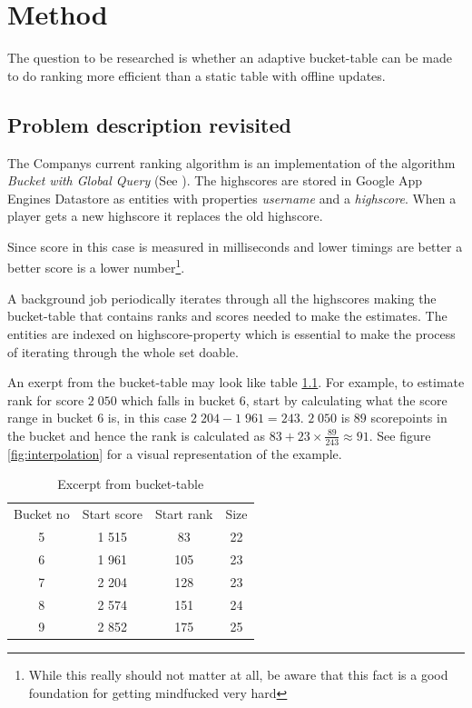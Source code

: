 \chapter{\label{method}Method}

The question to be researched is whether an adaptive bucket-table can be made to do ranking more efficient than a static table with offline updates.

\section{Problem description revisited}

The Companys current ranking algorithm is an implementation of the algorithm \emph{Bucket with Global Query} (See ). The highscores are stored in Google App Engines Datastore as entities with properties \emph{username} and a \emph{highscore}. When a player gets a new highscore it replaces the old highscore.

Since score in this case is measured in milliseconds and lower timings are better a better score is a lower number\footnote{While this really should not matter at all, be aware that this fact is a good foundation for getting mindfucked very hard}.

A background job  periodically iterates through all the highscores making the bucket-table that contains ranks and scores needed to make the estimates. The entities are indexed on highscore-property which is essential to make the process of iterating through the whole set doable.


An exerpt from the bucket-table may look like table \ref{table:ranking-table}. For example, to estimate rank for score $2\;050$ which falls in bucket 6, start by calculating what the score range in bucket 6 is, in this case $2\;204 - 1\;961 = 243$. $2\;050$ is $89$ scorepoints in the bucket and hence the rank is calculated as $83 + 23 \times \frac{89}{243} \approx 91$. See figure \ref{fig:interpolation} for a visual representation of the example.

\begin{table}[h]
  \begin{center}
  \begin{tabular}{ c c c c }
    Bucket no & Start score & Start rank & Size \\
    5 & 1 515 & 83 & 22 \\ 
    6 & 1 961 & 105 & 23 \\ 
    7 & 2 204 & 128 & 23 \\ 
    8 & 2 574 & 151 & 24 \\  
    9 & 2 852 & 175 & 25 \\ 
  \end{tabular} 
  \caption{Excerpt from bucket-table}
  \label{table:ranking-table}
  \end{center}
\end{table}

